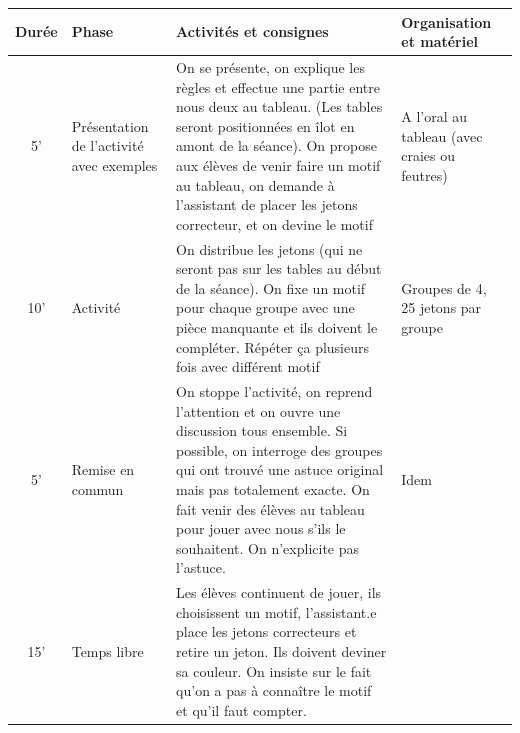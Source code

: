 \documentclass[12pt, a4paper]{article}
\begin{document}
	\begin{longtable}{c|m{3.9cm}|m{8.4cm}|m{2.4cm}}		\textbf{Durée} & \textbf{Phase} & \textbf{Activités et consignes} & \textbf{Organisation et matériel} \\ \hline\hline
		
		5' &
		
		Présentation de l'activité avec exemples
		
		&
		
		On se présente, on explique les règles et effectue une partie entre nous deux au tableau. (Les tables seront positionnées en îlot en amont de la séance). On propose aux élèves de venir faire un motif au tableau, on demande à l'assistant de placer les jetons correcteur, et on devine le motif
		
		& 
		
		A l'oral au tableau (avec craies ou feutres)
		
		
		\\ \hline
		
		10' & 
		
		Activité
		
		&
		
		On distribue les jetons (qui ne seront pas sur les tables au début de la séance).
		On fixe un motif pour chaque groupe avec une pièce manquante et ils doivent le compléter.
		Répéter ça plusieurs fois avec différent motif
		& 
		
		Groupes de 4, 25 jetons par groupe
        
        
		\\ \hline
		
        5'
		
		&
		
		Remise en commun
		
		& 
		
		On stoppe l'activité, on reprend l'attention et on ouvre une discussion tous ensemble. Si possible, on interroge des groupes qui ont trouvé une astuce original mais pas totalement exacte. On fait venir des élèves au tableau pour jouer avec nous s'ils le souhaitent. On n'explicite pas l'astuce.
		
		& Idem
		
		\\ \hline
		
		15' &
		
		Temps libre
		
		&
		Les élèves continuent de jouer, ils choisissent un motif, l'assistant.e place les jetons correcteurs et retire un jeton. Ils doivent deviner sa couleur. 
        On insiste sur le fait qu'on a pas à connaître le motif et qu'il faut compter.
		

\end{longtable}
\end{document}

